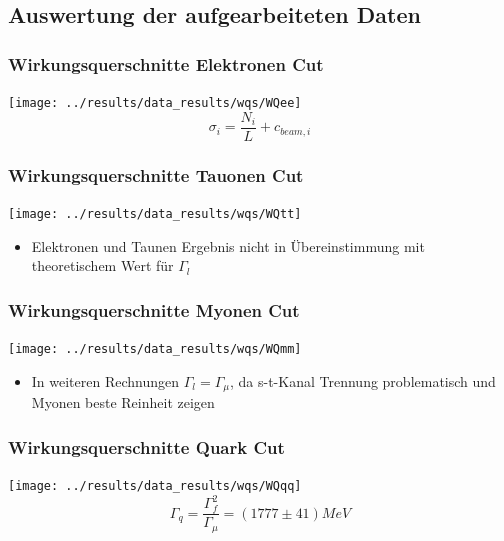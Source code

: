 \subsection{Auswertung der aufgearbeiteten Daten}
\begin{frame}
	\frametitle{Wirkungsquerschnitte Elektronen Cut}
	\centering
	\texttt{[image: ../results/data\_results/wqs/WQee]}
	\begin{equation*}
	\sigma_i=\frac{N_i}{L}+c_{beam,i}
	\end{equation*}
\end{frame}
\begin{frame}
	\frametitle{Wirkungsquerschnitte Tauonen Cut}
	\centering
	\texttt{[image: ../results/data\_results/wqs/WQtt]}
	\begin{itemize}
		\item Elektronen und Taunen Ergebnis nicht in Übereinstimmung mit theoretischem Wert für $\Gamma_l$
	\end{itemize}
\end{frame}
\begin{frame}
	\frametitle{Wirkungsquerschnitte Myonen Cut}
	\centering
	\texttt{[image: ../results/data\_results/wqs/WQmm]}
	\begin{itemize}
		\item In weiteren Rechnungen $\Gamma_l=\Gamma_\mu$, da s-t-Kanal Trennung problematisch und Myonen beste Reinheit zeigen
	\end{itemize}
\end{frame}
\begin{frame}
	\frametitle{Wirkungsquerschnitte Quark Cut}
	\centering
	\texttt{[image: ../results/data\_results/wqs/WQqq]}
	\begin{equation*}
		\Gamma_q=\frac{\Gamma_f^2}{\Gamma_\mu}=(1777\pm41)\unit{MeV}
	\end{equation*}
\end{frame}
